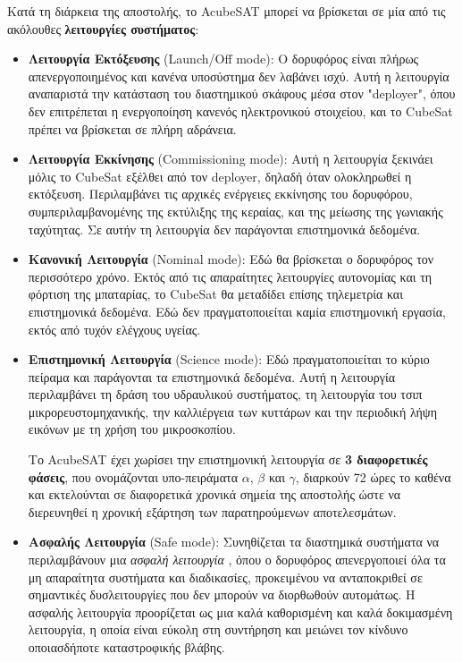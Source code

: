 \documentclass[a4paper,nobib]{tufte-book}
\begin{document}
Κατά τη διάρκεια της αποστολής, το AcubeSAT μπορεί να βρίσκεται σε μία από τις ακόλουθες \textbf{λειτουργίες συστήματος}: \autocite{MDO}
\begin{itemize}
	\item \textbf{Λειτουργία Εκτόξευσης} (Launch/Off mode): Ο δορυφόρος είναι πλήρως απενεργοποιημένος και κανένα υποσύστημα δεν λαβάνει ισχύ. Αυτή η λειτουργία αναπαριστά την κατάσταση του διαστημικού σκάφους μέσα στον "deployer", όπου δεν επιτρέπεται η ενεργοποίηση κανενός ηλεκτρονικού στοιχείου, \autocite[req. 3.3.3]{CDS13} και το CubeSat πρέπει να βρίσκεται σε πλήρη αδράνεια.
	
	\item \textbf{Λειτουργία Εκκίνησης} (Commissioning mode): Αυτή η λειτουργία ξεκινάει μόλις το CubeSat εξέλθει από τον deployer, δηλαδή όταν ολοκληρωθεί η εκτόξευση. Περιλαμβάνει τις αρχικές ενέργειες εκκίνησης του δορυφόρου, συμπεριλαμβανομένης της εκτύλιξης της κεραίας, και της μείωσης της γωνιακής ταχύτητας. Σε αυτήν τη λειτουργία δεν παράγονται επιστημονικά δεδομένα.
	
	\item \textbf{Κανονική Λειτουργία} (Nominal mode): Εδώ θα βρίσκεται ο δορυφόρος τον περισσότερο χρόνο. Εκτός από τις απαραίτητες λειτουργίες αυτονομίας και τη φόρτιση της μπαταρίας, το CubeSat θα μεταδίδει επίσης τηλεμετρία και επιστημονικά δεδομένα. Εδώ δεν πραγματοποιείται καμία επιστημονική εργασία, εκτός από τυχόν ελέγχους υγείας. %
	
	\item \textbf{Επιστημονική Λειτουργία} (Science mode): Εδώ πραγματοποιείται το κύριο πείραμα και παράγονται τα επιστημονικά δεδομένα. Αυτή η λειτουργία περιλαμβάνει τη δράση του υδραυλικού συστήματος, τη λειτουργία του τσιπ μικρορευστομηχανικής, την καλλιέργεια των κυττάρων και την περιοδική λήψη εικόνων με τη χρήση του μικροσκοπίου.
	
	Το AcubeSAT έχει χωρίσει την επιστημονική λειτουργία σε \textbf{3 διαφορετικές φάσεις}, που ονομάζονται υπο-πειράματα \(\alpha\), \(\beta\) και \(\gamma\), διαρκούν 72 ώρες το καθένα και εκτελούνται σε διαφορετικά χρονικά σημεία της αποστολής ώστε να διερευνηθεί η χρονική εξάρτηση των παρατηρούμενων αποτελεσμάτων.
	
	\item \textbf{Ασφαλής Λειτουργία} (Safe mode): Συνηθίζεται τα διαστημικά συστήματα να περιλαμβάνουν μια \emph{ασφαλή λειτουργία} \autocite[385]{aguirre_introduction_space_2013}, όπου ο δορυφόρος απενεργοποιεί όλα τα μη απαραίτητα συστήματα και διαδικασίες, προκειμένου να ανταποκριθεί σε σημαντικές δυσλειτουργίες που δεν μπορούν να διορθωθούν αυτομάτως. Η ασφαλής λειτουργία προορίζεται ως μια καλά καθορισμένη και καλά δοκιμασμένη λειτουργία, η οποία είναι εύκολη στη συντήρηση και μειώνει τον κίνδυνο οποιασδήποτε καταστροφικής βλάβης.
\end{itemize}
\end{document}
